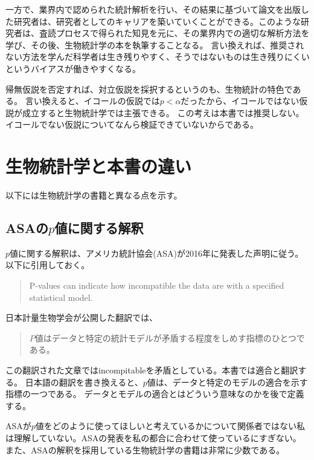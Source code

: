 一方で、業界内で認められた統計解析を行い、その結果に基づいて論文を出版した研究者は、研究者としてのキャリアを築いていくことができる。このような研究者は、査読プロセスで得られた知見を元に、その業界内での適切な解析方法を学び、その後、生物統計学の本を執筆することなる。
言い換えれば、推奨されない方法を学んだ科学者は生き残りやすく、そうではないものは生き残りにくいというバイアスが働きやすくなる。







帰無仮説を否定すれば、対立仮説を採択するというのも、生物統計の特色である。
言い換えると、イコールの仮説では$p<\alpha$だったから、イコールではない仮説が成立すると生物統計学では主張できる。
この考えは本書では推奨しない。
イコールでない仮説についてなんら検証できていないからである。
\fi



\section{生物統計学と本書の違い}
以下には生物統計学の書籍と異なる点を示す。

\subsection{ASAの$p$値に関する解釈}
$p$値に関する解釈は、アメリカ統計協会(ASA)が2016年に発表した声明に従う\cite{doi:10.1080/00031305.2016.1154108}。以下に引用しておく。
\begin{quote}
    P-values can indicate how incompatible the data are with a specified statistical model.
\end{quote}
日本計量生物学会が公開した翻訳では、
\begin{quote}
    $P$値はデータと特定の統計モデルが矛盾する程度をしめす指標のひとつである。
\end{quote}
この翻訳された文章ではincompitableを矛盾としている。本書では適合と翻訳する。
日本語の翻訳を書き換えると、$p$値は、データと特定のモデルの適合を示す指標の一つである。
データとモデルの適合とはどういう意味なのかを後で定義する。


ASAが$p$値をどのように使ってほしいと考えているかについて関係者ではない私は理解していない。ASAの発表を私の都合に合わせて使っているにすぎない。
また、ASAの解釈を採用している生物統計学の書籍は非常に少数である。

